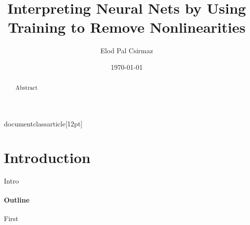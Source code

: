 documentclass{article}[12pt]
\title{Interpreting Neural Nets by Using Training to Remove Nonlinearities}
\author{Elod Pal Csirmaz}

\date{\today}


\maketitle

\begin{abstract}
Abstract
\end{abstract}

\section{Introduction}
Intro
\paragraph{Outline}
First





